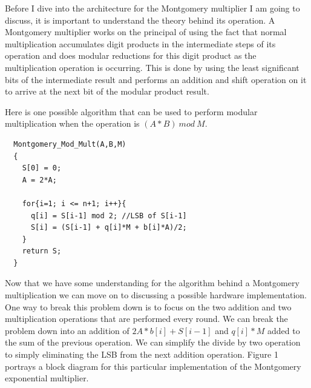 \documentclass[journal]{IEEEtran}
\begin{document}
Before I dive into the architecture for the Montgomery multiplier I am going to discuss, it is important to understand the theory behind its operation. A Montgomery multiplier works on the principal of using the fact that normal multiplication accumulates digit products in the intermediate steps of its operation and does modular reductions for this digit product as the multiplication operation is occurring. This is done by using the least significant bits of the intermediate result and performs an addition and shift operation on it to arrive at the next bit of the modular product result. 

Here is one possible algorithm that can be used to perform modular multiplication when the operation is $(A * B)\ mod\ M$. \\

\begin{lstlisting}
  Montgomery_Mod_Mult(A,B,M)
  {
    S[0] = 0;
    A = 2*A;
	  
    for{i=1; i <= n+1; i++}{
      q[i] = S[i-1] mod 2; //LSB of S[i-1]
      S[i] = (S[i-1] + q[i]*M + b[i]*A)/2;
    }
    return S;
  }
\end{lstlisting}

Now that we have some understanding for the algorithm behind a Montgomery multiplication we can move on to discussing a possible hardware implementation. One way to break this problem down is to focus on the two addition and two multiplication operations that are performed every round. We can break the problem down into an addition of $2A*b[i] + S[i-1]$ and $q[i]*M$ added to the sum of the previous operation. We can simplify the divide by two operation to simply eliminating the LSB from the next addition operation. Figure 1 portrays a block diagram for this particular implementation of the Montgomery exponential multiplier.
\end{document}
